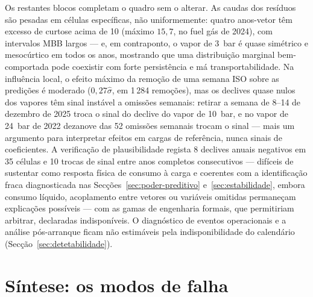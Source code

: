 Os restantes blocos completam o quadro sem o alterar. As caudas dos resíduos
são pesadas em células específicas, não uniformemente: quatro anos-vetor têm
excesso de curtose acima de 10 (máximo $15{,}7$, no fuel gás de 2024), com
intervalos MBB largos --- e, em contraponto, o vapor de 3~bar é quase
simétrico e mesocúrtico em todos os anos, mostrando que uma distribuição
marginal bem-comportada pode coexistir com forte persistência e má
transportabilidade. Na influência local, o efeito máximo da remoção de uma
semana ISO sobre as predições é moderado ($0{,}27\hat\sigma$, em 1\,284
remoções), mas os declives quase nulos dos vapores têm sinal instável a
omissões semanais: retirar a semana de 8--14 de dezembro de 2025 troca o
sinal do declive do vapor de 10~bar, e no vapor de 24~bar de 2022 dezanove
das 52 omissões semanais trocam o sinal --- mais um argumento para
interpretar efeitos em cargas de referência, nunca sinais de coeficientes. A
verificação de plausibilidade regista 8 declives anuais negativos em 35
células e 10 trocas de sinal entre anos completos consecutivos ---
difíceis de sustentar como resposta física de consumo à carga e coerentes com
a identificação fraca diagnosticada nas Secções~\ref{sec:poder-preditivo} e~\ref{sec:estabilidade}, embora consumo líquido,
acoplamento entre vetores ou variáveis omitidas permaneçam explicações
possíveis --- com as gamas de engenharia formais, que permitiriam arbitrar,
declaradas indisponíveis. O diagnóstico de eventos operacionais e a
análise pós-arranque ficam não estimáveis pela indisponibilidade do
calendário (Secção~\ref{sec:detetabilidade}).


\section{Síntese: os modos de falha}
\label{sec:sintese-modos-falha}


